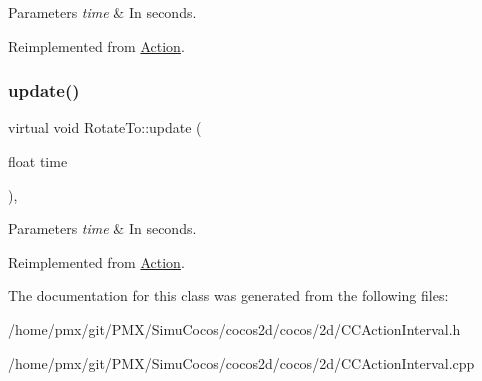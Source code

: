 \begin{DoxyParams}{Parameters}
{\em time} & In seconds. \\
\hline
\end{DoxyParams}


Reimplemented from \hyperlink{classAction_a937e646e63915e33ad05ba149bfcf239}{Action}.

\mbox{\label{classRotateTo_aa70e5807807b646fb4ff72091077e894}} 
\subsubsection{\texorpdfstring{update()}{update()}\hspace{0.1cm}{\footnotesize\ttfamily [2/2]}}
{\footnotesize\ttfamily virtual void Rotate\+To\+::update (\begin{DoxyParamCaption}\item[{float}]{time }\end{DoxyParamCaption})\hspace{0.3cm}{\ttfamily [override]}, {\ttfamily [virtual]}}


\begin{DoxyParams}{Parameters}
{\em time} & In seconds. \\
\hline
\end{DoxyParams}


Reimplemented from \hyperlink{classAction_a937e646e63915e33ad05ba149bfcf239}{Action}.



The documentation for this class was generated from the following files\+:\begin{DoxyCompactItemize}
\item 
/home/pmx/git/\+P\+M\+X/\+Simu\+Cocos/cocos2d/cocos/2d/C\+C\+Action\+Interval.\+h\item 
/home/pmx/git/\+P\+M\+X/\+Simu\+Cocos/cocos2d/cocos/2d/C\+C\+Action\+Interval.\+cpp\end{DoxyCompactItemize}
